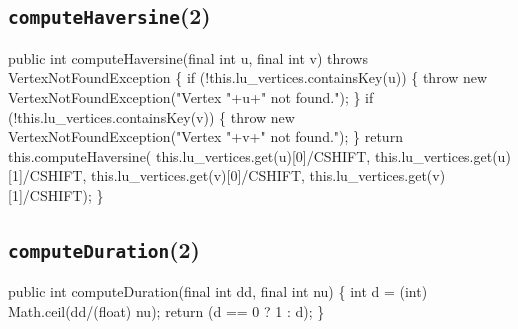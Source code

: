 \subsection{{\tt{}\protect{}computeHaversine}(2)}
\nwenddocs{}\plusendmoddef
public int computeHaversine(final int u, final int v) throws VertexNotFoundException \{
  if (!this.lu_vertices.containsKey(u)) \{
    throw new VertexNotFoundException("Vertex "+u+" not found.");
  \}
  if (!this.lu_vertices.containsKey(v)) \{
    throw new VertexNotFoundException("Vertex "+v+" not found.");
  \}
  return this.computeHaversine(
    this.lu_vertices.get(u)[0]/CSHIFT, this.lu_vertices.get(u)[1]/CSHIFT,
    this.lu_vertices.get(v)[0]/CSHIFT, this.lu_vertices.get(v)[1]/CSHIFT);
\}
\nwendcode{}\nwdocspar

\subsection{{\tt{}computeDuration}(2)}
\nwenddocs{}\endmoddef{}
public int computeDuration(final int dd, final int nu) \{
  int d = (int) Math.ceil(dd/(float) nu);
  return (d == 0 ? 1 : d);
\}
\nwendcode{}\nwdocspar


